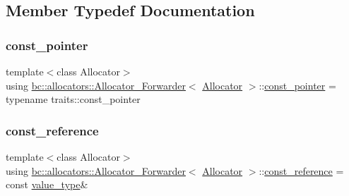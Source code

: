\subsection{Member Typedef Documentation}
\mbox{\label{structbc_1_1allocators_1_1Allocator__Forwarder_a11939ff4b2a42e10b10cd561f5480db2}} 
\subsubsection{\texorpdfstring{const\+\_\+pointer}{const\_pointer}}
{\footnotesize\ttfamily template$<$class Allocator$>$ \\
using \hyperlink{structbc_1_1allocators_1_1Allocator__Forwarder}{bc\+::allocators\+::\+Allocator\+\_\+\+Forwarder}$<$ \hyperlink{classbc_1_1allocators_1_1Allocator}{Allocator} $>$\+::\hyperlink{structbc_1_1allocators_1_1Allocator__Forwarder_a11939ff4b2a42e10b10cd561f5480db2}{const\+\_\+pointer} =  typename traits\+::const\+\_\+pointer}

\mbox{\label{structbc_1_1allocators_1_1Allocator__Forwarder_aaa022b1540e4d81d40d9742019c58cc4}} 
\subsubsection{\texorpdfstring{const\+\_\+reference}{const\_reference}}
{\footnotesize\ttfamily template$<$class Allocator$>$ \\
using \hyperlink{structbc_1_1allocators_1_1Allocator__Forwarder}{bc\+::allocators\+::\+Allocator\+\_\+\+Forwarder}$<$ \hyperlink{classbc_1_1allocators_1_1Allocator}{Allocator} $>$\+::\hyperlink{structbc_1_1allocators_1_1Allocator__Forwarder_aaa022b1540e4d81d40d9742019c58cc4}{const\+\_\+reference} =  const \hyperlink{structbc_1_1allocators_1_1Allocator__Forwarder_a3ac0b07579279c948a24ee6562510dc5}{value\+\_\+type}\&}

